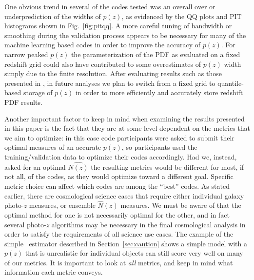 One obvious trend in several of the codes tested was an overall over or underprediction of the widths of $p(z)$, as evidenced by the QQ plots and PIT histograms shown in Fig.~\ref{fig:pitqq}.  A more careful tuning of bandwidth or smoothing during the validation process appears to be necessary for many of the machine learning based codes in order to improve the accuracy of $p(z)$.  For narrow peaked $p(z)$ the parameterization of the PDF as evaluated on a fixed redshift grid could also have contributed to some overestimates of $p(z)$ width simply due to the finite resolution.  After evaluating results such as those presented in \citet[]{Malz:qp}, in future analyses we plan to switch from a fixed grid to quantile-based storage of $p(z)$ in order to more efficiently and accurately store redshift PDF results.

Another important factor to keep in mind when examining the results presented in this paper is the fact that they are at some level dependent on the metrics that we aim to optimize: in this case code participants were asked to submit their optimal measures of an accurate $p(z)$, so participants used the training/validation data to optimize their codes accordingly.  Had we, instead, asked for an optimal $\hat{N(z)}$ the resulting metrics would be different for most, if not all, of the codes, as they would optimize toward a different goal.  Specific metric choice can affect which codes are among the ``best'' codes.  As stated earlier, there are cosmological science cases that require either individual galaxy photo-$z$ measures, or ensemble $\hat{N}(z)$ measures.  We must be aware of that the optimal method for one is not necessarily optimal for the other, and in fact several photo-$z$ algorithms may be necessary in the final cosmological analysis in order to satisfy the requirements of all science use cases.  The example of the simple \trainz\ estimator described in Section~\ref{sec:caution} shows a simple model with a $p(z)$ that is unrealistic for individual objects can still score very well on many of our metrics.  It is important to look at {\it all} metrics, and keep in mind what information each metric conveys.
